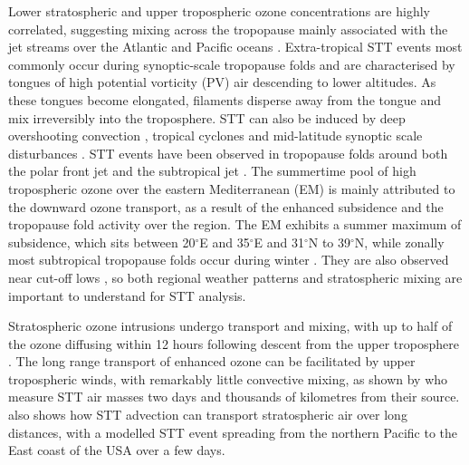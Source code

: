 \documentclass[acp, manuscript]{copernicus} %
\begin{document}
  Lower stratospheric and upper tropospheric ozone concentrations are highly correlated, suggesting mixing across the tropopause mainly associated with the jet streams over the Atlantic and Pacific oceans \citep{Terao2008}.
  Extra-tropical STT events most commonly occur during synoptic-scale tropopause folds \citep{Sprenger2003, Tang2012, Frey2015} and are characterised by tongues of high potential vorticity (PV) air descending to lower altitudes.
  As these tongues become elongated, filaments disperse away from the tongue and mix irreversibly into the troposphere.
  STT can also be induced by deep overshooting convection \citep{Frey2015}, tropical cyclones \citep{Das2016} and mid-latitude synoptic scale disturbances \citep[e.g.][]{Stohl2003, Mihalikova2012}. 
  STT events have been observed in tropopause folds around both the polar front jet \citep{Vaughan1994, Beekmann1997} and the subtropical jet \citep{Baray2000}.
  The summertime pool of high tropospheric ozone over the eastern Mediterranean (EM) is mainly attributed to the downward ozone transport, as a result of the enhanced subsidence \citep{Zanis2014} and the tropopause fold activity \citep{Akritidis2016} over the region.
  The EM exhibits a summer maximum of subsidence, which sits between 20$^{\circ}$E and 35$^{\circ}$E and 31$^{\circ}$N to 39$^{\circ}$N, while zonally most subtropical tropopause folds occur during winter \citep[][and references therein]{Tyrlis2014}.
  They are also observed near cut-off lows \citep{Price1993, Wirth1995}, so both regional weather patterns and stratospheric mixing are important to understand for STT analysis.
  
  Stratospheric ozone intrusions undergo transport and mixing, with up to half of the ozone diffusing within 12 hours following descent from the upper troposphere \citep{Trickl2014}.
  The long range transport of enhanced ozone can be facilitated by upper tropospheric winds, with remarkably little convective mixing, as shown by \cite{Trickl2014} who measure STT air masses two days and thousands of kilometres from their source.
  \citet{Cooper2004} also shows how STT advection can transport stratospheric air over long distances, with a modelled STT event spreading from the northern Pacific to the East coast of the USA over a few days.
  
\end{document}
